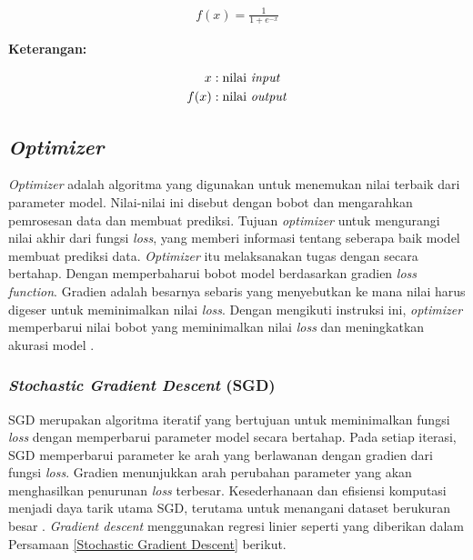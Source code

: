     \begin{equation}
        \begin{aligned}
            f(x) = \frac{1}{1 + e^{-x}}
        \end{aligned}\label{Aktifasi Fungsi Sigmoid}
    \end{equation}

     \textbf{Keterangan:}
     
        \begin{align*}
        x & : \text{nilai \textit{input}} \\
        f(x) & :\text{nilai \textit{output}} 
        \end{align*}

        


\subsection{\textit{Optimizer}}

\textit{Optimizer} adalah algoritma yang digunakan untuk menemukan nilai terbaik dari parameter model. Nilai-nilai ini disebut dengan bobot dan mengarahkan pemrosesan data dan membuat prediksi. Tujuan \textit{optimizer} untuk mengurangi nilai akhir dari fungsi \textit{loss}, yang memberi informasi tentang seberapa baik model membuat prediksi data. \textit{Optimizer} itu melaksanakan tugas dengan secara bertahap. Dengan memperbaharui bobot model berdasarkan gradien \textit{loss function}. Gradien adalah besarnya sebaris yang menyebutkan ke mana nilai harus digeser untuk meminimalkan nilai \textit{loss}. Dengan mengikuti instruksi ini, \textit{optimizer} memperbarui nilai bobot yang meminimalkan nilai \textit{loss} dan meningkatkan akurasi model \cite{ruder2017overview}.



\subsubsection{\textit{Stochastic Gradient Descent} (SGD)}

SGD merupakan algoritma iteratif yang bertujuan untuk meminimalkan fungsi \textit{loss} dengan memperbarui parameter 
model secara bertahap.  Pada setiap iterasi, SGD memperbarui parameter ke arah yang berlawanan dengan gradien dari 
fungsi \textit{loss}.  Gradien menunjukkan arah perubahan parameter yang akan menghasilkan penurunan \textit{loss} 
terbesar.  Kesederhanaan dan efisiensi komputasi menjadi daya tarik utama SGD, terutama untuk menangani dataset 
berukuran besar \cite{math11061360}.
\textit{Gradient descent} menggunakan regresi linier seperti yang diberikan dalam Persamaan \ref{Stochastic Gradient Descent} 
berikut.

